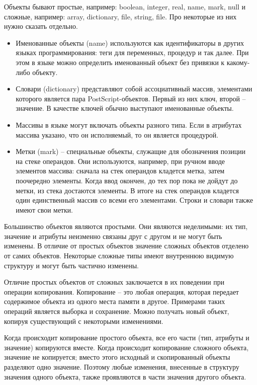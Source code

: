 \documentclass[14pt]{extarticle}
\begin{document}
Объекты бывают простые, например: boolean, integer, real, name, mark, null и сложные, например: array, dictionary, file, string, file. Про некоторые из них нужно сказать отдельно.
\begin{itemize}
\item Именованные объекты (name) используются как идентификаторы в других языках программирования: теги для переменных, процедур и так далее. При этом в языке можно определить именованный объект без привязки к какому-либо объекту.
\item Словари (dictionary) представляют собой ассоциативный массив, элементами которого является пара PostScript-объектов. Первый из них ключ, второй -- значение. В качестве ключей обычно выступают именованные объекты.
\item Массивы в языке могут включать объекты разного типа. Если в атрибутах массива указано, что он исполняемый, то он является процедурой.
\item Метки (mark) -- специальные объекты, служащие для обозначения позиции на стеке операндов. Они используются, например, при ручном вводе элементов массива: сначала на стек операндов кладется метка, затем поочередно элементы. Когда ввод окончен, до тех пор пока не дойдут до метки, из стека достаются элементы. В итоге на стек операндов кладется один единственный массив со всеми его элементами. Строки и словари также имеют свои метки.
\end{itemize}

Большинство объектов являются простыми. Они являются неделимыми: их тип, значение и атрибуты неизменно связаны друг с другом и не могут быть изменены. В отличие от простых объектов значение сложных объектов отделено от самих объектов. Некоторые сложные типы имеют внутреннюю видимую структуру и могут быть частично изменены.

Отличие простых объектов от сложных заключается в их поведении при операции копирования. Копирование – это любая операция, которая передает содержимое объекта из одного места памяти в другое. Примерами таких операций является выборка и сохранение. Можно получать новый объект, копируя существующий с некоторыми изменениями.

Когда происходит копирование простого объекта, все его части (тип, атрибуты и значение) копируются вместе. Когда происходит копирование сложного объекта, значение не копируется; вместо этого исходный и скопированный объекты разделяют одно значение.  Поэтому любые изменения, внесенные в структуру значения одного объекта, также проявляются в части значения другого объекта.
\end{document}
